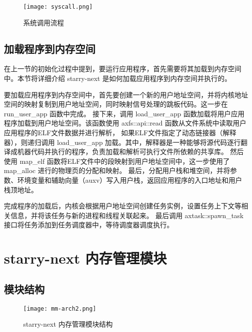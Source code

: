 \begin{figure}[H]
    \centering
    \texttt{[image: syscall.png]}
    \caption{系统调用流程}
    \label{fig:syscall}
\end{figure}

\subsection{加载程序到内存空间}

在上一节的初始化过程中提到，要运行应用程序，首先需要将其加载到内存空间中。本节将详细介绍 starry-next 是如何加载应用程序到内存空间并执行的。

要加载应用程序到内存空间中，首先要创建一个新的用户地址空间，并将内核地址空间的映射复制到用户地址空间，同时映射信号处理的跳板代码。这一步在 run\_user\_app 函数中完成。
接下来，调用 load\_user\_app 函数加载将用户应用程序加载到用户地址空间。该函数使用 axfs::api::read 函数从文件系统中读取用户应用程序的ELF文件数据并进行解析，
如果ELF文件指定了动态链接器（解释器），则递归调用 load\_user\_app 加载。其中，解释器是一种能够将源代码逐行翻译成机器代码并执行的程序，负责加载和解析可执行文件所依赖的共享库。
然后使用 map\_elf 函数将ELF文件中的段映射到用户地址空间中，这一步使用了 map\_alloc 进行的物理页的分配和映射。
最后，分配用户栈和堆空间，并将参数、环境变量和辅助向量（auxv）写入用户栈，返回应用程序的入口地址和用户栈顶地址。

完成程序的加载后，内核会根据用户地址空间创建任务实例，设置任务上下文等相关信息，并将该任务与新的进程和线程关联起来。
最后调用 axtask::spawn\_task 接口将任务添加到任务调度器中，等待调度器调度执行。



\section{starry-next 内存管理模块}

\subsection{模块结构}

\begin{figure}[H]
    \centering
    \texttt{[image: mm-arch2.png]}
    \caption{starry-next 内存管理模块结构}
    \label{fig:mm-arch}
\end{figure}

